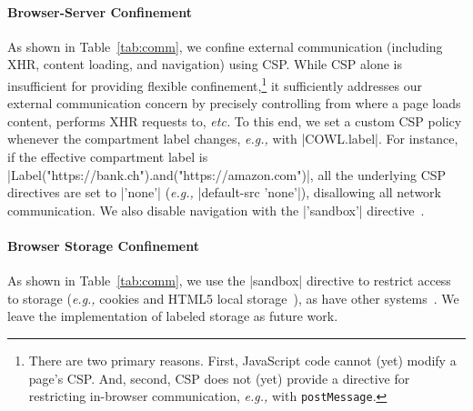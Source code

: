 \paragraph{Browser-Server Confinement}%
%
As shown in Table~\ref{tab:comm}, we confine external communication
(including XHR, content loading, and navigation) using CSP\@.
%
%
While CSP alone is insufficient for providing flexible
confinement,\footnote{
There are two primary reasons. First,
JavaScript code cannot (yet) modify a page's CSP\@.
And, second, CSP does not (yet) provide a directive for restricting 
in-browser communication, \emph{e.g.,} with \texttt{postMessage}.
}
it sufficiently addresses our external communication concern by
precisely controlling from where a page loads content, performs XHR
requests to, \emph{etc.}
%
To this end, we set a custom CSP policy whenever the compartment label
changes, \emph{e.g.,} with \js|COWL.label|.
%
For instance, if the effective compartment label is
\js|Label("https://bank.ch").and("https://amazon.com")|, all the
underlying CSP directives are set to \js|'none'| (\emph{e.g.,}
\js|default-src 'none'|), disallowing all network communication.  We
also disable navigation with the \js|'sandbox'|
directive~\cite{csp1.1,whatwg-html,html5}.
%

\paragraph{Browser Storage Confinement}
As shown in Table~\ref{tab:comm}, we use the \js|sandbox| directive to
restrict access to storage (\emph{e.g.,} cookies and HTML5 local
storage~\cite{html5}), as have other systems~\cite{Akhawe2013}.
%
%
We leave the implementation of labeled storage as
future work.


